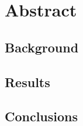 \section*{Abstract}
\setcounter{page}{2}

\subsection*{Background}
% 
% 
% 

\subsection*{Results}
\subsection*{Conclusions}
\thispagestyle{empty}

